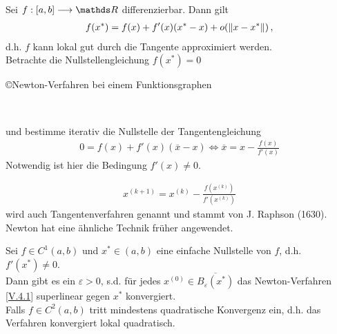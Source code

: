  
Sei $f:[a,b]\longrightarrow \R$ differenzierbar. Dann gilt
\begin{gather*}
  f(x^{*}) = f(x) + f'(x)(x^{*}-x)+o(\left\| x-x^{*} \right\|) \, ,
\end{gather*} 
d.h. $f$ kann lokal gut durch die Tangente approximiert werden. \\
Betrachte die Nullstellengleichung $f(x^{*}) = 0$ \\

\begin{image}{\copyright Newton-Verfahren bei einem Funktionsgraphen}
  \\
\end{image}
\label{im5.4}

und bestimme iterativ die Nullstelle der Tangentengleichung
\begin{gather*}
  0=f(x) + f'(x)(\overline{x}-x) \Leftrightarrow \overline{x}= x-\frac{f(x)}{f'(x)}
\end{gather*}
Notwendig ist hier die Bedingung $f'(x) \neq 0$.


\begin{gather}
  x^{(k+1)} = x^{(k)} - \frac{f(x^{(k)})}{f'(x^{(k)})}
  \label{V.4.1}
\end{gather}
wird auch Tangentenverfahren genannt und stammt von
J. Raphson (1630). Newton hat eine ähnliche Technik früher angewendet.

\begin{Satze}
  \label{5.4.2}
  Sei $f\in C^1(a,b)$ und $x^{*}\in (a,b)$ eine einfache Nullstelle von $f$, d.h. $f'(x^{*})\neq 0$. \\
  Dann gibt es ein  $\varepsilon >0$, s.d. für jedes $x^{(0)}\in\overline{B_\varepsilon(x^{*})}$
  das Newton-Verfahren \eqref{V.4.1} superlinear gegen $x^{*}$ konvergiert.\\
  Falls $f\in C^2(a,b) $ tritt mindestens quadratische Konvergenz ein, d.h. das Verfahren
  konvergiert lokal quadratisch.
\end{Satze}


